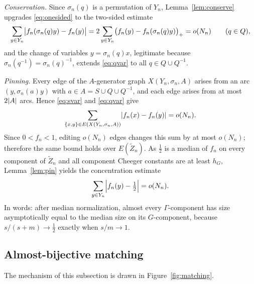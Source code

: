 \documentclass[11pt]{amsart}
\theoremstyle{definition}
\theoremstyle{plain}
\DeclarePairedDelimiter{\abs}{\lvert}{\rvert}
\begin{document}
\emph{Conservation.}  Since \(\sigma_n(q)\) is a permutation of \(Y_n\), Lemma~\ref{lem:conserve} upgrades \eqref{eq:onesided} to the two-sided estimate
\begin{equation}\label{eq:qvar}
 \sum_{y\in Y_n}\abs[\big]{f_n(\sigma_n(q)y)-f_n(y)}
 =2\sum_{y\in Y_n}\bigl(f_n(y)-f_n(\sigma_n(q)y)\bigr)_+
 =o(N_n)
 \qquad(q\in Q),
\end{equation}
and the change of variables \(y=\sigma_n(q)x\), legitimate because \(\sigma_n(q^{-1})=\sigma_n(q)^{-1}\), extends \eqref{eq:qvar} to all \(q\in Q\cup Q^{-1}\).

\emph{Pinning.}  Every edge of the \(A\)-generator graph \(X(Y_n,\sigma_n,A)\) arises from an arc \((y,\sigma_n(a)y)\) with \(a\in A=S\cup Q\cup Q^{-1}\), and each edge arises from at most \(2\abs A\) arcs.  Hence \eqref{eq:svar} and \eqref{eq:qvar} give
\[
 \sum_{\{x,y\}\in E(X(Y_n,\sigma_n,A))}\abs{f_n(x)-f_n(y)}=o(N_n).
\]
Since \(0<f_n<1\), editing \(o(N_n)\) edges changes this sum by at most \(o(N_n)\); therefore the same bound holds over \(E(\widetilde Z_n)\).  As \(\frac12\) is a median of \(f_n\) on every component of \(\widetilde Z_n\) and all component Cheeger constants are at least \(h_G\), Lemma~\ref{lem:pin} yields the concentration estimate
\begin{equation}\label{eq:pinsum}
 \sum_{y\in Y_n}\abs[\Big]{f_n(y)-\tfrac12}=o(N_n).
\end{equation}
In words: after median normalization, almost every \(\Gamma\)-component has size asymptotically equal to the median size on its \(G\)-component, because \(s/(s+m)\to\frac12\) exactly when \(s/m\to1\).

\subsection{Almost-bijective matching}\label{subsec:matching}

The mechanism of this subsection is drawn in Figure~\ref{fig:matching}.
\end{document}
